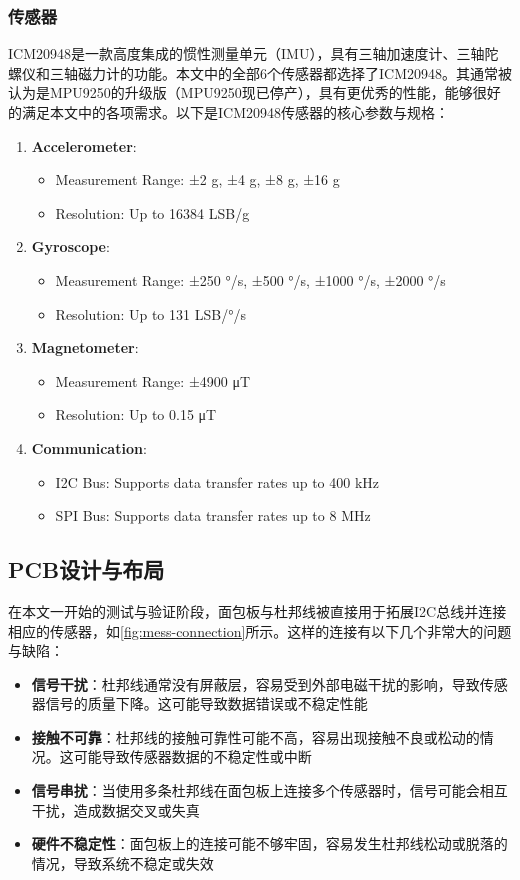 \subsubsection{传感器}
ICM20948是一款高度集成的惯性测量单元（IMU），具有三轴加速度计、三轴陀螺仪和三轴磁力计的功能。本文中的全部6个传感器都选择了ICM20948。其通常被认为是MPU9250的升级版（MPU9250现已停产），具有更优秀的性能，能够很好的满足本文中的各项需求。以下是ICM20948传感器的核心参数与规格：
\begin{enumerate}[label=(\alph*)]
    \item {\bfseries Accelerometer}:
        \begin{itemize}
            \item Measurement Range: ±2 g, ±4 g, ±8 g, ±16 g
            \item Resolution: Up to 16384 LSB/g
        \end{itemize}
    \item {\bfseries Gyroscope}:
        \begin{itemize}
            \item Measurement Range: ±250 °/s, ±500 °/s, ±1000 °/s, ±2000 °/s
            \item Resolution: Up to 131 LSB/°/s
        \end{itemize}
    \item {\bfseries Magnetometer}:
        \begin{itemize}
            \item Measurement Range: ±4900 μT
            \item Resolution: Up to 0.15 μT
        \end{itemize}
    \item {\bfseries Communication}:
        \begin{itemize}
            \item I2C Bus: Supports data transfer rates up to 400 kHz
            \item SPI Bus: Supports data transfer rates up to 8 MHz
        \end{itemize}
\end{enumerate}


\subsection{PCB设计与布局}
在本文一开始的测试与验证阶段，面包板与杜邦线被直接用于拓展I2C总线并连接相应的传感器，如\autoref{fig:mess-connection}所示。这样的连接有以下几个非常大的问题与缺陷：
\begin{itemize}
    \item {\bfseries 信号干扰}：杜邦线通常没有屏蔽层，容易受到外部电磁干扰的影响，导致传感器信号的质量下降。这可能导致数据错误或不稳定性能
    \item {\bfseries 接触不可靠}：杜邦线的接触可靠性可能不高，容易出现接触不良或松动的情况。这可能导致传感器数据的不稳定性或中断
    \item {\bfseries 信号串扰}：当使用多条杜邦线在面包板上连接多个传感器时，信号可能会相互干扰，造成数据交叉或失真
    \item {\bfseries 硬件不稳定性}：面包板上的连接可能不够牢固，容易发生杜邦线松动或脱落的情况，导致系统不稳定或失效
\end{itemize}

